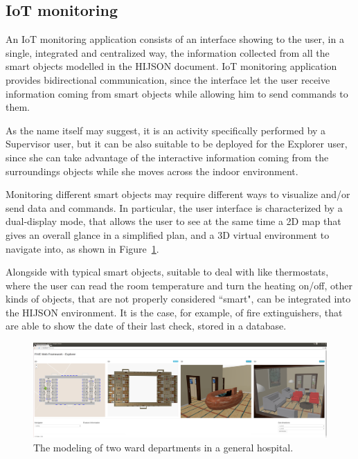 \documentclass[]{egpubl}
\begin{document}
\subsection{IoT monitoring}

An IoT monitoring application consists of an interface showing to the user, in
a single, integrated and centralized way, the information collected from all
the smart objects modelled in the HIJSON document. IoT monitoring application
provides bidirectional communication, since the interface let the user receive
information coming from smart objects while allowing him to send commands to
them.

As the name itself may suggest, it is an activity specifically performed by a
Supervisor user, but it can be also suitable to be deployed for the Explorer
user, since she can take advantage of the interactive information coming from
the surroundings objects while she moves across the indoor environment.

Monitoring different smart objects may require different ways to visualize
and/or send data and commands. In particular, the user interface is
characterized by a dual-display mode, that allows the user to see at the same
time a 2D map that gives an overall glance in a simplified plan, and a 3D
virtual environment to navigate into, as shown in Figure~\ref{fig:hospital}.

Alongside with typical smart objects, suitable to deal with like thermostats,
where the user can read the room temperature and turn the heating on/off,
other kinds of objects, that are not properly considered ``smart", can be
integrated into the HIJSON environment. It is the case, for example, of fire
extinguishers, that are able to show the date of their last check, stored in a
database.

\begin{figure}[htbp] %
   \centering
   \includegraphics[width=\textwidth]{images/ward2} 
   \caption{The modeling of two ward departments in a general hospital.}
   \label{fig:hospital}
\end{figure}
\end{document}
